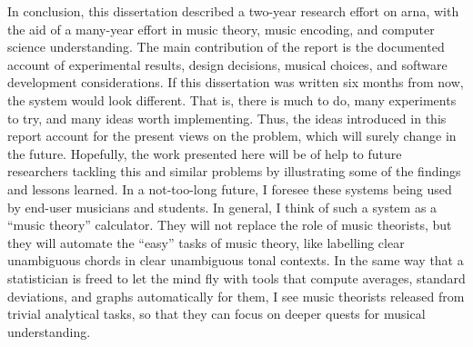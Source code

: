 
In conclusion, this dissertation described a two-year
research effort on \gls{arna}, with the aid of a many-year
effort in music theory, music encoding, and computer science
understanding. The main contribution of the report is the
documented account of experimental results, design
decisions, musical choices, and software development
considerations. If this dissertation was written six months
from now, the system would look different. That is, there is
much to do, many experiments to try, and many ideas worth
implementing. Thus, the ideas introduced in this report
account for the present views on the problem, which will
surely change in the future.  Hopefully, the work presented
here will be of help to future researchers tackling this and
similar problems by illustrating some of the findings and
lessons learned. In a not-too-long future, I foresee these
systems being used by end-user musicians and students. In
general, I think of such a system as a ``music theory''
calculator. They will not replace the role of music
theorists, but they will automate the ``easy'' tasks of
music theory, like labelling clear unambiguous chords in
clear unambiguous tonal contexts. In the same way that a
statistician is freed to let the mind fly with tools that
compute averages, standard deviations, and graphs
automatically for them, I see music theorists released from
trivial analytical tasks, so that they can focus on deeper
quests for musical understanding.
